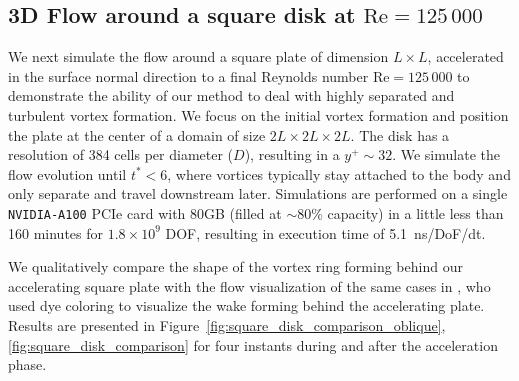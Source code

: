 \documentclass[final,1p,times]{elsarticle}
\begin{document}

\subsection{3D Flow around a square disk at $\text{Re}=125\,000$}

We next simulate the flow around a square plate of dimension $L\times L$, accelerated in the surface normal direction to a final Reynolds number $\text{Re}=125\,000$ to demonstrate the ability of our method to deal with highly separated and turbulent vortex formation. We focus on the initial vortex formation and position the plate at the center of a domain of size $2L\times2L\times2L$. The disk has a resolution of 384 cells per diameter ($D$), resulting in a $y^+\sim 32$. We simulate the flow evolution until $t^*<6$, where vortices typically stay attached to the body and only separate and travel downstream later. Simulations are performed on a single \texttt{NVIDIA-A100} PCIe card with 80GB (filled at $\sim80\%$ capacity) in a little less than 160 minutes for $1.8\times10^9$ DOF, resulting in execution time of 5.1~ns/DoF/dt.


We qualitatively compare the shape of the vortex ring forming behind our accelerating square plate with the flow visualization of the same cases in \cite{Higuchi1996Three-dimensionalPlates}, who used dye coloring to visualize the wake forming behind the accelerating plate. Results are presented in Figure~\ref{fig:square_disk_comparison_oblique}, \ref{fig:square_disk_comparison} for four instants during and after the acceleration phase. 
\end{document}
